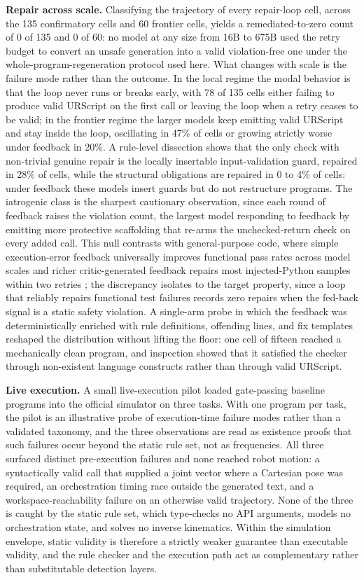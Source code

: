 \documentclass{ieeeaccess}
\begin{document}
\textbf{Repair across scale.} Classifying the trajectory of every repair-loop cell,
across the 135 confirmatory cells and 60 frontier cells, yields a remediated-to-zero
count of 0 of 135 and 0 of 60: no model at any size from 16B to 675B used the retry
budget to convert an unsafe generation into a valid violation-free one under the whole-program-regeneration protocol used here. What changes
with scale is the failure mode rather than the outcome. In the local regime the modal
behavior is that the loop never runs or breaks early, with 78 of 135 cells either
failing to produce valid URScript on the first call or leaving the loop when a retry
ceases to be valid; in the frontier regime the larger models keep emitting valid
URScript and stay inside the loop, oscillating in 47\% of cells or growing strictly
worse under feedback in 20\%. A rule-level dissection shows that the only check with
non-trivial genuine repair is the locally insertable input-validation guard, repaired
in 28\% of cells, while the structural obligations are repaired in 0 to 4\% of cells:
under feedback these models insert guards but do not restructure programs. The
iatrogenic class is the sharpest cautionary observation, since each round of feedback
raises the violation count, the largest model responding to feedback by emitting more
protective scaffolding that re-arms the unchecked-return check on every added call. This
null contrasts with general-purpose code, where simple execution-error feedback
universally improves functional pass rates across model scales \cite{ref47} and richer
critic-generated feedback repairs most injected-Python samples within two retries
\cite{ref56}; the discrepancy isolates to the target property, since a loop that
reliably repairs functional test failures records zero repairs when the fed-back signal
is a static safety violation. A single-arm probe in which the feedback was
deterministically enriched with rule definitions, offending lines, and fix templates
reshaped the distribution without lifting the floor: one cell of fifteen reached a
mechanically clean program, and inspection showed that it satisfied the checker through
non-existent language constructs rather than through valid URScript.

\textbf{Live execution.} A small live-execution pilot loaded gate-passing baseline
programs into the official simulator on three tasks. With one program per task, the pilot
is an illustrative probe of execution-time failure modes rather than a validated
taxonomy, and the three observations are read as existence proofs that such failures occur
beyond the static rule set, not as frequencies. All three surfaced distinct
pre-execution failures and none reached robot motion: a syntactically valid call that
supplied a joint vector where a Cartesian pose was required, an orchestration timing
race outside the generated text, and a workspace-reachability failure on an otherwise
valid trajectory. None of the three is caught by the static rule set, which
type-checks no API arguments, models no orchestration state, and solves no inverse
kinematics. Within the simulation envelope, static validity is therefore a strictly
weaker guarantee than executable validity, and the rule checker and the execution
path act as complementary rather than substitutable detection layers.
\end{document}
